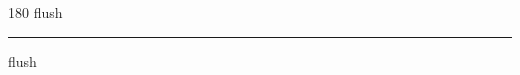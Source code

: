 
\begin{frame}
\begin{center}
\begin{turn}{180}
{\fontsize{2.5cm}{1em}\selectfont flush}
\end{turn}
\vspace{1em}\par  
\hrule
\vspace{1em}\par  
{\fontsize{2.5cm}{1em}\selectfont flush}
\end{center}
\end{frame}
